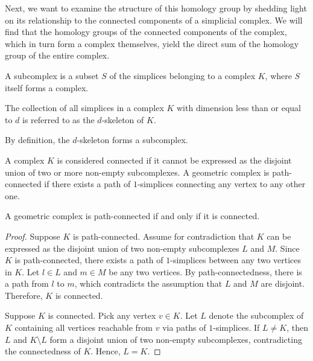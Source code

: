 Next, we want to examine the structure of this homology group by shedding light on its relationship to the connected components of a simplicial complex. We will find that the homology groups of the connected components of the complex, which in turn form a complex themselves, yield the direct sum of the homology group of the entire complex.

\begin{definition}
	A subcomplex is a subset \( S \) of the simplices belonging to a complex \( K \), where \( S \) itself forms a complex.
\end{definition}

\begin{definition}
	The collection of all simplices in a complex \( K \) with dimension less than or equal to \( d \) is referred to as the \( d \)-skeleton of \( K \).
\end{definition}

By definition, the \( d \)-skeleton forms a subcomplex.

\begin{definition}
	A complex \( K \) is considered connected if it cannot be expressed as the disjoint union of two or more non-empty subcomplexes. A geometric complex is path-connected if there exists a path of \( 1 \)-simplices connecting any vertex to any other one.
\end{definition}

\begin{lemma}
	\label{pathconnect}
	A geometric complex is path-connected if and only if it is connected.
\end{lemma}

\begin{proof}
	Suppose \( K \) is path-connected. Assume for contradiction that \( K \) can be expressed as the disjoint union of two non-empty subcomplexes \( L \) and \( M \). Since \( K \) is path-connected, there exists a path of \( 1 \)-simplices between any two vertices in \( K \). Let \( l \in L \) and \( m \in M \) be any two vertices. By path-connectedness, there is a path from \( l \) to \( m \), which contradicts the assumption that \( L \) and \( M \) are disjoint. Therefore, \( K \) is connected.
				
	Suppose \( K \) is connected. Pick any vertex \( v \in K \). Let \( L \) denote the subcomplex of \( K \) containing all vertices reachable from \( v \) via paths of \( 1 \)-simplices. If \( L \neq K \), then \( L \) and \( K \setminus L \) form a disjoint union of two non-empty subcomplexes, contradicting the connectedness of \( K \). Hence, \( L = K \).
\end{proof}

